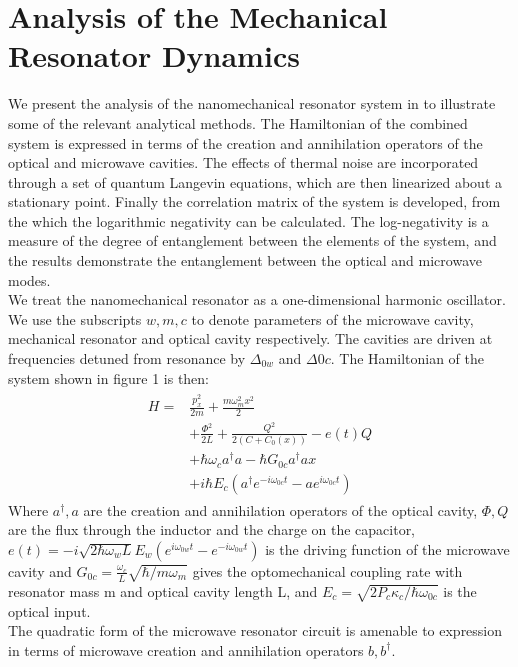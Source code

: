 \documentclass[a4paper,11pt, twocolumn]{article}
\numberwithin{equation}{section}
\begin{document}
\section{Analysis of the Mechanical Resonator Dynamics}
We present the analysis of the nanomechanical resonator system in \cite{nanoMR} to illustrate some of the relevant analytical methods.
The Hamiltonian of the combined system is expressed in terms of the creation and annihilation operators of the optical and microwave cavities.
The effects of thermal noise are incorporated through a set of quantum Langevin equations, which are then linearized about a stationary point. 
Finally the correlation matrix of the system is developed, from the which the logarithmic negativity can be calculated.
The log-negativity is a measure of the degree of entanglement between the elements of the system, and the results demonstrate the entanglement between the optical and microwave modes.
\\
We treat the nanomechanical resonator as a one-dimensional harmonic oscillator. 
We use the subscripts $w,m,c$ to denote parameters of the microwave cavity, mechanical resonator and optical cavity respectively.
The cavities are driven at frequencies detuned from resonance by $\Delta_{0w}$ and $\Delta{0c}$.
The Hamiltonian of the system shown in figure 1 is then:
\begin{align}
\begin{split}
 H = &\frac{p_x^2}{2m}+\frac{m\omega_m^2x^2}{2}\\
     &+\frac{\Phi^2}{2L}+\frac{Q^2}{2(C+C_0(x))}-e(t)Q\\
     &+\hbar\omega_c a^\dagger a-\hbar G_{0c}a^\dagger ax\\
     &+i\hbar E_c\left(a^\dagger e^{-i\omega_{0c}t}-ae^{i\omega_{0c}t} \right)
 \end{split}
\end{align}
Where $a^\dagger,a$ are the creation and annihilation operators of the optical cavity, $\Phi,Q$ are the flux through the inductor and the charge on the capacitor,
$e(t)=-i\sqrt{2\hbar\omega_wL}E_w\left(e^{i\omega_{0w}t}-e^{-i\omega_{0w}t} \right)$ is the driving function of the microwave cavity
and $G_{0c}=\frac{\omega_c}{L}\sqrt{\hbar/m\omega_m} $ gives the optomechanical coupling rate with resonator mass m and optical cavity length L,
and $E_c=\sqrt{2P_c\kappa_c/\hbar\omega_{0c}}$ is the optical input.
\\
The quadratic form of the microwave resonator circuit is amenable to expression in terms of microwave creation and annihilation operators $b,b^\dagger$.
\end{document}
